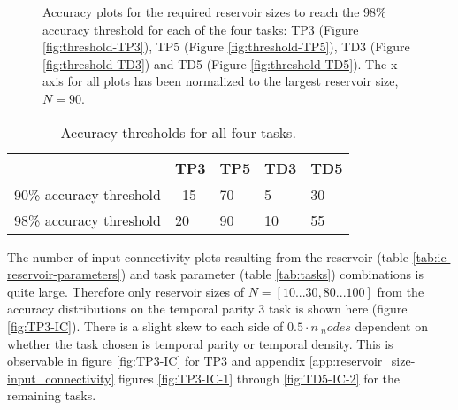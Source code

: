 \begin{figure}[ht]
    \centering
    \resizebox{\textwidth}{!}{
        \subfloat[TP3, N=20]{
            
            \label{fig:threshold-TP3}
        }
        \subfloat[TP5, N=90]{
            
            \label{fig:threshold-TP5}
        }
    }
    \resizebox{\textwidth}{!}{
        \subfloat[TD3, N=10]{
            
            \label{fig:threshold-TD3}
        }
        \subfloat[TD5, N=55]{
            
            \label{fig:threshold-TD5}
        }
    }
    \caption[Required reservoir sizes to reach the 98\% accuracy threshold for all tasks]{
        Accuracy plots for the required reservoir sizes to reach the 98\% accuracy threshold for each of the four tasks:
        TP3 (Figure \ref{fig:threshold-TP3}), TP5 (Figure \ref{fig:threshold-TP5}), TD3 (Figure \ref{fig:threshold-TD3}) and TD5 (Figure \ref{fig:threshold-TD5}).
        The x-axis for all plots has been normalized to the largest reservoir size, $N=90$.
    }
    \label{fig:accuracy-threshold-size}
\end{figure}

\begin{table}[ht]
    \centering
    \caption{Accuracy thresholds for all four tasks.}
    \label{tab:accuracy-thresholds}
    \begin{tabular}{lllll}
    \hline
    \hline
                            & \textbf{TP3} & \textbf{TP5} & \textbf{TD3} & \textbf{TD5} \\
    \hline
    90\% accuracy threshold & ~15 & 70  & 5   & 30  \\
    98\% accuracy threshold & 20  & 90  & 10  & 55  \\
    \hline
    \end{tabular}
\end{table}

The number of input connectivity plots resulting from the reservoir (table \ref{tab:ic-reservoir-parameters}) and task parameter (table \ref{tab:tasks}) combinations is quite large.
Therefore only reservoir sizes of $ N=[10...30, 80...100]$ from the accuracy distributions on the temporal parity 3 task is shown here (figure \ref{fig:TP3-IC}).
There is a slight skew to each side of $ 0.5 \cdot n\ _nodes $ dependent on whether the task chosen is temporal parity or temporal density.
This is observable in figure \ref{fig:TP3-IC} for TP3 and appendix \ref{app:reservoir_size-input_connectivity} figures \ref{fig:TP3-IC-1} through \ref{fig:TD5-IC-2} for the remaining tasks.


